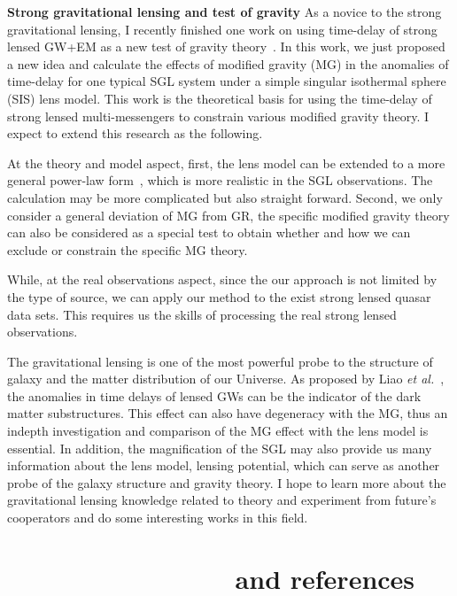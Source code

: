 \documentclass[11pt,letterpaper,sans]{moderncv}   %
\begin{document}
\vspace{2mm}
\noindent
\textcolor{color1}{\textbf{Strong gravitational lensing and test of gravity}}
As a novice to the strong gravitational lensing, I recently finished one work on using time-delay of strong lensed GW+EM as a new test of gravity theory~\cite{Yang:2018bdf}.
In this work, we just proposed a new idea and calculate the effects of modified gravity (MG) in the anomalies of time-delay for one typical SGL system under a simple singular isothermal sphere (SIS) lens model. This work is the theoretical basis  for using the time-delay of strong lensed multi-messengers to constrain various modified gravity theory. I expect to extend this research as the following.

\vspace{2mm}
\noindent
At the theory and model aspect, first, the lens model can be extended to a more general power-law form~\cite{Holanda:2017jrj}, which is  more realistic in the SGL observations. The calculation may be more complicated but also straight forward. Second, we only consider a general deviation of MG from GR, the specific modified gravity theory can also be considered as a special test to obtain whether and how we can exclude or constrain the specific MG theory.

\vspace{2mm}
\noindent
While, at the real observations aspect, since the our approach is not limited by the type of source, we can apply our method to the exist strong lensed quasar data sets.  This requires us the skills of processing the real strong lensed observations.

\vspace{2mm}
\noindent
The gravitational lensing is one of the most powerful probe to the structure of galaxy and the matter distribution of our Universe. As proposed by Liao \textit{et al.}~\cite{Liao:2018ofi}, the anomalies in time delays of lensed GWs can be the indicator of the dark matter substructures. This effect can also have  degeneracy with the MG, thus an indepth investigation and comparison of the MG effect with the lens model is essential. In addition, the magnification of the SGL may also provide us many information about the lens model, lensing potential, which can serve as another probe of the galaxy structure and gravity theory. I hope to learn more about the gravitational lensing knowledge related to theory and experiment from future's cooperators and do some interesting works in this field. 



\section{~~~~~~~~~~~~~~~~and references}








\vspace{-13.7mm}




\end{document}
